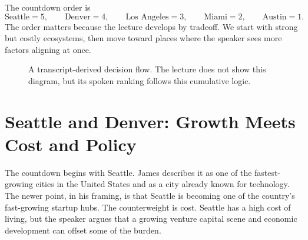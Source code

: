 The countdown order is
\begin{equation}
\text{Seattle}=5,\qquad
\text{Denver}=4,\qquad
\text{Los Angeles}=3,\qquad
\text{Miami}=2,\qquad
\text{Austin}=1.
\end{equation}
The order matters because the lecture develops by tradeoff. We start with strong but costly ecosystems, then move toward places where the speaker sees more factors aligning at once.

\begin{figure}
\centering
{}
\caption{A transcript-derived decision flow. The lecture does not show this diagram, but its spoken ranking follows this cumulative logic.}
\end{figure}

\section{Seattle and Denver: Growth Meets Cost and Policy}

The countdown begins with Seattle. James describes it as one of the fastest-growing cities in the United States and as a city already known for technology. The newer point, in his framing, is that Seattle is becoming one of the country's fast-growing startup hubs. The counterweight is cost. Seattle has a high cost of living, but the speaker argues that a growing venture capital scene and economic development can offset some of the burden.

